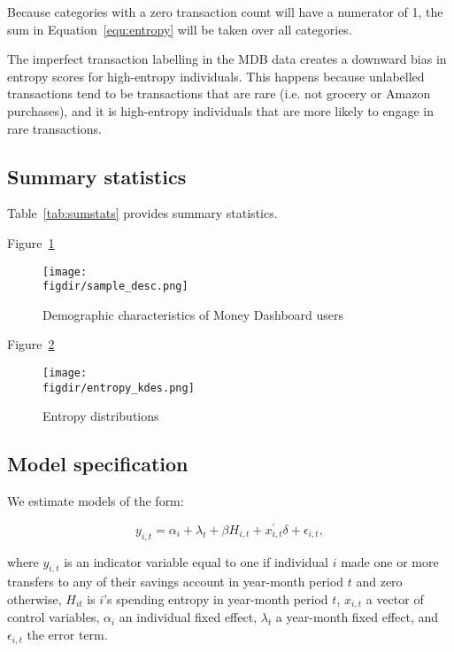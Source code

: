Because categories with a zero transaction count will have a numerator of 1,
the sum in Equation~\ref{equ:entropy} will be taken over all categories.

The imperfect transaction labelling in the MDB data creates a downward bias in
entropy scores for high-entropy individuals. This happens because unlabelled
transactions tend to be transactions that are rare (i.e. not grocery or Amazon
purchases), and it is high-entropy individuals that are more likely to engage
in rare transactions.


\subsection{Summary statistics}%
\label{par:summary_statistics}

Table~\ref{tab:sumstats} provides summary statistics.



Figure~\ref{fig:sample_desc}
\begin{figure}[H]
    \caption{Demographic characteristics of Money Dashboard users}
    \label{fig:sample_desc}
    \begin{center}
        \texttt{[image: \\figdir/sample\_desc.png]}
    \end{center}
\end{figure}

Figure~\ref{fig:entropy_kdes}
\begin{figure}[H]
    \center \newcommand\width{\textwidth} \caption{Entropy distributions}
    \label{fig:entropy_kdes}
    \texttt{[image: \\figdir/entropy\_kdes.png]}
    \fignote{\width}{}
\end{figure}


\subsection{Model specification}%
\label{par:model_specification}

We estimate models of the form: 

\begin{equation}
    y_{i,t} = \alpha_i + \lambda_t + \beta H_{i,t} + x^\prime_{i,t} \delta +
    \epsilon_{i,t},
\end{equation}

\noindent where $y_{i,t}$ is an indicator variable equal to one if individual $i$ made
one or more transfers to any of their savings account in year-month period $t$ and zero
otherwise, $H_{it}$ is $i$'s spending entropy in year-month period $t$, $x_{i,t}$ a vector
of control variables, $\alpha_i$ an individual fixed effect, $\lambda_t$ a
year-month fixed effect, and $\epsilon_{i, t}$ the error term.

